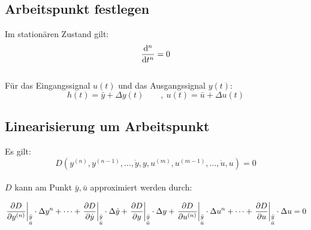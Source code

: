 \subsection{Arbeitspunkt festlegen}

Im stationären Zustand gilt:
\[
	\frac{\mathrm{d} ^n}{\mathrm{d} t^n} = 0
\]
~\\
Für das Eingangssignal $u(t)$ und das Ausgangssignal $y(t)$:
\[
	h(t) = \bar{y} + \Delta y(t) \qquad ,\ u(t) = \bar{u} + \Delta u(t)
\]


\subsection{Linearisierung um Arbeitspunkt}
Es gilt:
\[
	D(y^{(n)}, y^{(n-1)}, \dots ,\dot{y} ,y, u^{(m)}, u^{(m-1)}, \dots , \dot{u} ,u)= 0
\]
~\\
$D$ kann am Punkt $\bar{y}, \bar{u}$ approximiert werden durch:
\begin{small}
\[
	\left.\pdifrac{D}{y^{(n)}}\right|_{\begin{scriptsize}\begin{matrix} \bar{y} \\ \bar{u} \end{matrix}\end{scriptsize}} \cdot \Delta y^{n} + \dots +
	\left.\pdifrac{D}{\dot{y}}\right|_{\begin{scriptsize}\begin{matrix} \bar{y} \\ \bar{u} \end{matrix}\end{scriptsize}} \cdot \Delta \dot{y} +
	\left.\pdifrac{D}{y}\right|_{\begin{scriptsize}\begin{matrix} \bar{y} \\ \bar{u} \end{matrix}\end{scriptsize}} \cdot \Delta y +
	\left.\pdifrac{D}{u^{(n)}}\right|_{\begin{scriptsize}\begin{matrix} \bar{y} \\ \bar{u} \end{matrix}\end{scriptsize}} \cdot \Delta u^{n} + \dots +
	\left.\pdifrac{D}{u}\right|_{\begin{scriptsize}\begin{matrix} \bar{y} \\ \bar{u} \end{matrix}\end{scriptsize}} \cdot \Delta u = 0
\]
\end{small}

